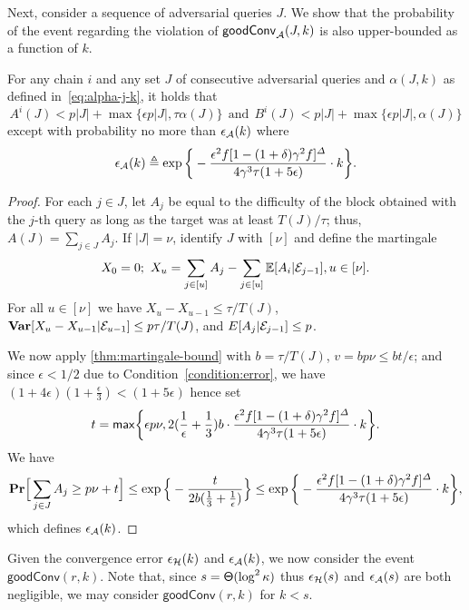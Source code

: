 Next, consider a sequence of adversarial queries $J$.
%
We show that the probability of the event regarding the violation of $\mathsf{goodConv}_\mathcal{A}(J, k)$ is also upper-bounded as a function of $k$.

\begin{theorem} \label{thm:adversarial-convergence-prob}
    For any chain $i$ and any set $J$ of consecutive adversarial queries and $\alpha(J, k)$ as defined in~\cref{eq:alpha-j-k}, it holds that
    \[ A^i(J) < p|J| + \max \{ \epsilon p|J|, \tau \alpha(J) \} ~~\mathrm{and}~~ B^i(J) < p|J| + \max \{ \epsilon p|J|, \alpha(J) \} \]
    except with probability no more than $\epsilon_\mathcal{A}(k)$ where
    \[ \epsilon_\mathcal{A}(k) \triangleq \exp \bigg\{ - \frac{\epsilon^2 f [1 - (1 + \delta) \gamma^2 f]^{\varDelta}}{4 \gamma^3 \tau (1 + 5\epsilon)} \cdot k \bigg\}. \]
\end{theorem}

\begin{proof}
    For each $j \in J$, let $A_j$ be equal to the difficulty of the block obtained with the $j$-th query as long as the target was at least $T (J)/\tau$; thus, $A(J) = \sum_{j \in J} A_j$.
    If $|J| = \nu$, identify $J$ with $[\nu]$ and define the martingale
    \[ X_0 = 0;~ X_u = \sum_{j \in [u]} A_j - \sum_{j \in [u]} \mathbb{E} [A_i | \mathcal{E}_{j - 1}], u \in [\nu]. \]
    For all $u \in [\nu]$ we have $X_u - X_{u - 1} \le \tau /T (J)$, $\mathbf{Var}[X_u - X_{u - 1} | \mathcal{E}_{u - 1}] \le p\tau / T(J)$, and $E[A_j | \mathcal{E}_{j - 1}] \le p$.

    We now apply \cref{thm:martingale-bound} with $b = \tau / T(J)$, $v = bp \nu \le bt / \epsilon$; and since $\epsilon < 1 / 2$ due to Condition~\eqref{condition:error}, we have $(1 + 4\epsilon)(1 + \frac{\epsilon}{3}) < (1 + 5\epsilon)$ hence set
    \[ t = \mathsf{max} \bigg\{ \epsilon p \nu, 2 (\frac{1}{\epsilon} + \frac{1}{3}) b \cdot \frac{\epsilon^2 f [1 - (1 + \delta) \gamma^2 f]^{\varDelta}}{4 \gamma^3 \tau (1 + 5\epsilon)} \cdot k \bigg\}. \]
    We have
    \[ \mathbf{Pr} \Big[ \sum_{j \in J} A_j \ge p \nu + t \Big] \le \exp \Big\{ - \frac{t}{2b (\frac{1}{3} + \frac{1}{\epsilon})} \Big\} \le \exp \bigg\{ - \frac{\epsilon^2 f [1 - (1 + \delta) \gamma^2 f]^{\varDelta}}{4 \gamma^3 \tau (1 + 5\epsilon)} \cdot k \bigg\}, \]
    which defines $\epsilon_\mathcal{A}(k)$.
\end{proof}

Given the convergence error $\epsilon_\mathcal{H}(k)$ and $\epsilon_\mathcal{A}(k)$, we now consider the event $\mathsf{goodConv}(r, k)$.
%
Note that, since $s = \mathsf{\Theta}(\log^2 \kappa)$ thus $\epsilon_\mathcal{H}(s)$ and $\epsilon_\mathcal{A}(s)$ are both negligible, we may consider $\mathsf{goodConv}(r, k)$ for $k < s$.

